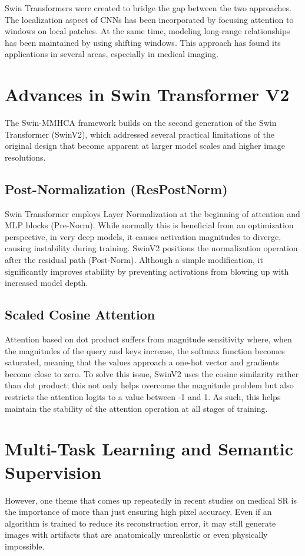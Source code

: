 Swin Transformers were created to bridge the gap between the two approaches. The localization aspect of CNNs has been incorporated by focusing attention to windows on local patches. At the same time, modeling long-range relationships has been maintained by using shifting windows. This approach has found its applications in several areas, especially in medical imaging.
\section{Advances in Swin Transformer V2}
The Swin-MMHCA framework builds on the second generation of the Swin Transformer (SwinV2), which addressed several practical limitations of the original design that become apparent at larger model scales and higher image resolutions.

\subsection{Post-Normalization (ResPostNorm)}
Swin Transformer employs Layer Normalization at the beginning of attention and MLP blocks (Pre-Norm). While normally this is beneficial from an optimization perspective, in very deep models, it causes activation magnitudes to diverge, causing instability during training. SwinV2 positions the normalization operation after the residual path (Post-Norm). Although a simple modification, it significantly improves stability by preventing activations from blowing up with increased model depth.

\subsection{Scaled Cosine Attention}
Attention based on dot product suffers from magnitude sensitivity where, when the magnitudes of the query and keys increase, the softmax function becomes saturated, meaning that the values approach a one-hot vector and gradients become close to zero. To solve this issue, SwinV2 uses the cosine similarity rather than dot product; this not only helps overcome the magnitude problem but also restricts the attention logits to a value between -1 and 1. As such, this helps maintain the stability of the attention operation at all stages of training.

\section{Multi-Task Learning and Semantic Supervision}
However, one theme that comes up repeatedly in recent studies on medical SR is the importance of more than just ensuring high pixel accuracy. Even if an algorithm is trained to reduce its reconstruction error, it may still generate images with artifacts that are anatomically unrealistic or even physically impossible.

